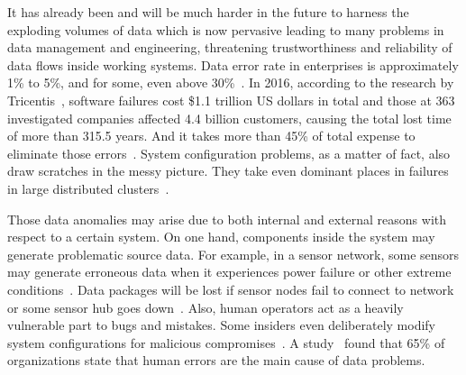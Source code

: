 \documentclass[a4paper]{IEEEtran}
\begin{document}
		It has already been and will be much harder in the future to harness the exploding volumes of data which is now pervasive leading to many problems in data management and engineering, threatening trustworthiness and reliability of data flows inside working systems.
		Data error rate in enterprises is approximately 1\% to 5\%, and for some, even above 30\%~\autocite{saha2014data}.
		In 2016, according to the research by Tricentis~\cite{softwareFailure}, software failures cost \$1.1 trillion US dollars in total and those at 363 investigated companies affected 4.4 billion customers, causing the total lost time of more than 315.5 years. And it takes more than 45\% of total expense to eliminate those errors~\cite{pawar2016software}. System configuration problems, as a matter of fact, also draw scratches in the messy picture. They take even dominant places in failures in large distributed clusters~\cite{xu2015systems}.
		
		Those data anomalies may arise due to both internal and external reasons with respect to a certain system. On one hand, components inside the system may generate problematic source data. For example, in a sensor network, some sensors may generate erroneous data when it experiences power failure or other extreme conditions~\autocite{rassam2014adaptive}. Data packages will be lost if sensor nodes fail to connect to network or some sensor hub goes down~\autocite{herodotou2014scalable}. Also, human operators act as a heavily vulnerable part to bugs and mistakes. Some insiders even deliberately modify system configurations for malicious compromises~\autocite{schuster2015vc3}. A study~\autocite{humanError} found that 65\% of organizations state that human errors are the main  cause of data problems.
		
\end{document}
